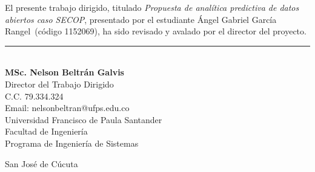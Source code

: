 \documentclass[12pt,letterpaper,oneside]{report}
\newcommand{\tituloproyecto}{Propuesta de analítica predictiva de datos abiertos caso SECOP}
\newcommand{\autorproyecto}{Ángel Gabriel García Rangel}
\newcommand{\codigoautor}{1152069}
\newcommand{\directorproyecto}{MSc. Nelson Beltrán Galvis}
\newcommand{\universidad}{Universidad Francisco de Paula Santander}
\newcommand{\facultad}{Facultad de Ingeniería}
\newcommand{\programa}{Programa de Ingeniería de Sistemas}
\newcommand{\ciudadanio}{San José de Cúcuta\\ \the\year}
\begin{document}
\vspace{1cm}

\noindent
El presente trabajo dirigido, titulado \emph{\tituloproyecto}, presentado por
el estudiante \autorproyecto\ (código \codigoautor), ha sido revisado y
avalado por el director del proyecto.

\vspace{4cm}

\begin{center}
\rule{8cm}{0.4pt}\\[0.3cm]
\textbf{\directorproyecto}\\
Director del Trabajo Dirigido\\
C.C. 79.334.324\\
Email: nelsonbeltran@ufps.edu.co\\
\universidad\\
\facultad\\
\programa
\end{center}

\vspace{2cm}

\begin{center}
\ciudadanio
\end{center}
\end{document}
